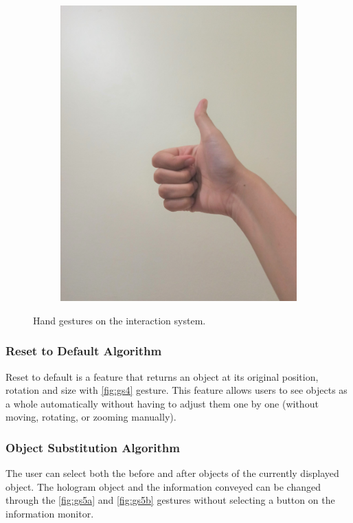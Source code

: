 \documentclass[conference]{IEEEtran}
\begin{document}
\begin{figure} [h]
\begin{center}
\begin{subfigure}[t]{0.11\textwidth}
			\includegraphics[width=\textwidth]{img/pola8d.jpg}
			\caption{\label{fig:gs8d}}
		\end{subfigure}
		\end{center}
		\vspace{-1ex}
		\caption{Hand gestures on the interaction system.}
		\label{fig:gestur_interaksi}
	\end{figure}
	\vspace{-2ex}
	
	\subsubsection{Reset to Default Algorithm }
		Reset to default is a feature that returns an object at its original position, rotation and size with \ref{fig:gs4} gesture. This feature allows users to see objects as a whole automatically without having to adjust them one by one (without moving, rotating, or zooming manually).

	\subsubsection{Object Substitution Algorithm}
		The user can select both the before and after objects of the currently displayed object. The hologram object and the information conveyed can be changed through the \ref{fig:gs5a} and \ref{fig:gs5b} gestures without selecting a button on the information monitor.
\end{document}
